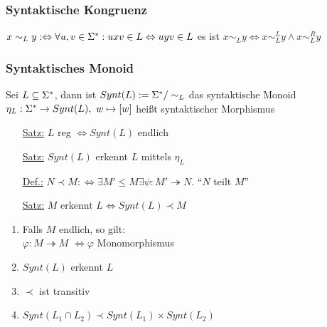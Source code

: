         \subsubsection{Syntaktische Kongruenz}
            $x\sim_L y :\Leftrightarrow \forall u,v\in\Sigma^*:uxv\in L\Leftrightarrow uyv\in L$ es ist $x\sim_L y\Leftrightarrow x\sim_L^L y\wedge x\sim_L^R y$
        \subsubsection{Syntaktisches Monoid}
            Sei $L\subseteq\Sigma^*$, dann ist $Synt(L):=\Sigma^*/\sim_L$ das syntaktische Monoid\\
            $\eta_L:\Sigmas\rightarrow Synt(L),\ w\mapsto[w]$ heißt syntaktischer Morphismus
            \begin{itemize}
                \item[\underline{Satz:}] $L$ reg $\Leftrightarrow Synt(L)$ endlich
                \item[\underline{Satz:}] $Synt(L)$ erkennt $L$ mittels $\eta_L$
                \item[\underline{Def.:}] $N\prec M :\Leftrightarrow \exists M'\le M\exists\psi:M'\twoheadrightarrow N$. ``$N$ teilt $M$''
                \item[\underline{Satz:}] $M$ erkennt $L\Leftrightarrow Synt(L)\prec M$
            \end{itemize}
            \begin{enumerate}[1)]
                \item Falls $M$ endlich, so gilt:\\
                $\varphi:M\twoheadrightarrow M$ $\Leftrightarrow \varphi$ Monomorphismus
                \item $Synt(L)$ erkennt $L$
                \item $\prec$ ist transitiv
                \item $Synt(L_1\cap L_2)\prec Synt(L_1)\times Synt(L_2)$
            \end{enumerate}
